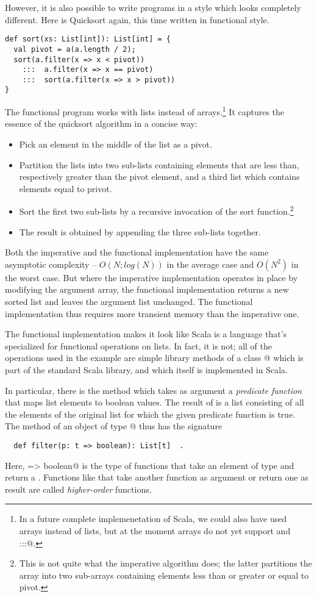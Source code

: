 \documentclass[11pt]{book}
\begin{document}
However, it is also possible to write programs in a style which looks
completely different. Here is Quicksort again, this time written in
functional style.

\begin{verbatim}
def sort(xs: List[int]): List[int] = {
  val pivot = a(a.length / 2);
  sort(a.filter(x => x < pivot))
    :::  a.filter(x => x == pivot)
    :::  sort(a.filter(x => x > pivot))
}
\end{verbatim}

The functional program works with lists instead of arrays.\footnote{In
a future complete implemenetation of Scala, we could also have used arrays
instead of lists, but at the moment arrays do not yet support
\verb@filter@ and \verb@:::@.}
It captures the essence of the quicksort algorithm in a concise way:
\begin{itemize}
\item Pick an element in the middle of the list as a pivot.
\item Partition the lists into two sub-lists containing elements that
are less than, respectively greater than the pivot element, and a
third list which contains elements equal to privot.
\item Sort the first two sub-lists by a recursive invocation of
the sort function.\footnote{This is not quite what the imperative algorithm does;
the latter partitions the array into two sub-arrays containing elements
less than or greater or equal to pivot.}
\item The result is obtained by appending the three sub-lists together.
\end{itemize}
Both the imperative and the functional implementation have the same
asymptotic complexity -- $O(N;log(N))$ in the average case and
$O(N^2)$ in the worst case. But where the imperative implementation
operates in place by modifying the argument array, the functional
implementation returns a new sorted list and leaves the argument
list unchanged. The functional implementation thus requires more
transient memory than the imperative one.

The functional implementation makes it look like Scala is a language
that's specialized for functional operations on lists. In fact, it
is not; all of the operations used in the example are simple library
methods of a class \verb@List[t]@ which is part of the standard
Scala library, and which itself is implemented in Scala.

In particular, there is the method \verb@filter@ which takes as
argument a {\em predicate function} that maps list elements to
boolean values. The result of \verb@filter@ is a list consisting of
all the elements of the original list for which the given predicate
function is true.  The \verb@filter@ method of an object of type
\verb@List[t]@ thus has the signature
\begin{verbatim}
  def filter(p: t => boolean): List[t]  .
\end{verbatim}
Here, \verb@t => boolean@ is the type of functions that take an element
of type \verb@t@ and return a \verb@boolean@.  Functions like
\verb@filter@ that take another function as argument or return one as
result are called {\em higher-order} functions.
\end{document}
